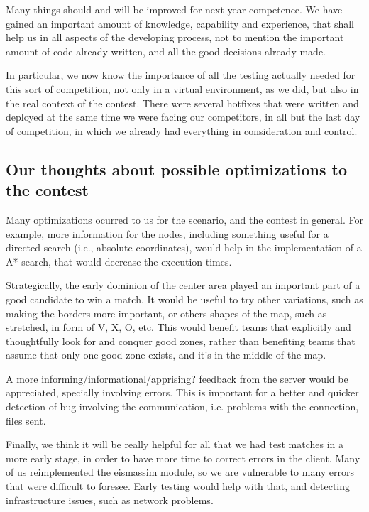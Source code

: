 \documentclass{llncs2e/llncs}
\begin{document}
    Many things should and will be improved for next year competence. We have
    gained an important amount of knowledge, capability and experience, that shall 
    help us in all aspects of the developing process, not to mention the 
    important amount of code already written, and all the good decisions already 
    made.

    In particular, we now know the importance of all the testing actually needed 
    for this sort of competition, not only in a virtual environment, as we did, 
    but also in the real context of the contest. There were several hotfixes that 
    were written and deployed at the same time we were facing our competitors, in 
    all but the last day of competition, in which we already had everything in 
    consideration and control.

\subsection{Our thoughts about possible optimizations to the contest}
    
    Many optimizations ocurred to us for the scenario, and the contest in general. 
    For example, more information for the nodes, including something useful for a 
    directed search (i.e., absolute coordinates), would help in the implementation 
    of a A* search, that would decrease the execution times.

    Strategically, the early dominion of the center area played an important part 
    of a good candidate to win a match. It would be useful to try other 
    variations, such as making the borders more important, or others shapes of the 
    map, such as stretched, in form of V, X, O, etc. This would benefit teams that 
    explicitly and thoughtfully look for and conquer good zones, rather than 
    benefiting teams that assume that only one good zone exists, and it's in the 
    middle of the map.

    A more informing/informational/apprising? feedback from the server would be 
    appreciated, specially involving errors. This is important for a better and 
    quicker detection of bug involving the communication, i.e. problems with the 
    connection, files sent.

    Finally, we think it will be really helpful for all that we had test matches 
    in a more early stage, in order to have more time to correct errors in the 
    client. Many of us reimplemented the eismassim module, so we are vulnerable to 
    many errors that were difficult to foresee. Early testing would help with 
    that, and detecting infrastructure issues, such as network problems.
    
    

    
 
 


\end{document}
